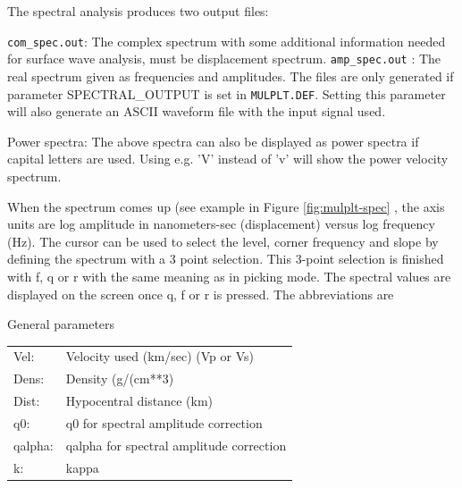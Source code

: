 The spectral analysis produces two output files: 

\texttt{com\_spec.out}: The complex spectrum with some additional information 
needed for surface wave analysis, must 
be displacement spectrum.\newline
\texttt{amp\_spec.out} : The real spectrum given as frequencies and amplitudes. 
The files are only generated if parameter SPECTRAL\_OUTPUT is set 
in \texttt{MULPLT.DEF}. Setting this parameter will also generate 
an ASCII waveform file with the input signal used. 

Power spectra: The above spectra can also be displayed as power spectra if capital letters are used. Using e.g. 'V' instead of 'v' will show the power velocity spectrum. 

When the spectrum comes up (see example in Figure 
\ref{fig:mulplt-spec}
, the axis units are log amplitude in nanometers-sec (displacement) versus log frequency (Hz). The cursor can be used to select the level, corner frequency and slope by defining the spectrum with a 3 point selection.  This 3-point selection is finished with f, q or r with the same meaning as in picking mode. The spectral values are displayed on the screen once q, f or r is pressed. The abbreviations are 

General parameters 

\begin{tabular}{|ll|}
\hline
Vel: & Velocity used (km/sec) (Vp or Vs) \\
Dens: & Density (g/(cm**3) \\
Dist: & Hypocentral distance (km) \\
q0: & q0 for spectral amplitude correction \\
qalpha: & qalpha for spectral amplitude correction \\
k: & kappa \\
\hline
\end{tabular}
\newline

